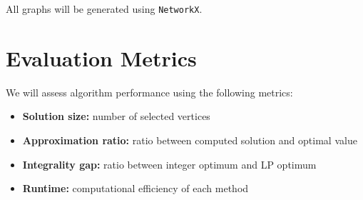 \documentclass[11pt,a4paper]{article}
\begin{document}
All graphs will be generated using \texttt{NetworkX}.

\section{Evaluation Metrics}

We will assess algorithm performance using the following metrics:

\begin{itemize}[leftmargin=*]
    \item \textbf{Solution size:} number of selected vertices
    \item \textbf{Approximation ratio:} ratio between computed solution and optimal value
    \item \textbf{Integrality gap:} ratio between integer optimum and LP optimum
    \item \textbf{Runtime:} computational efficiency of each method
\end{itemize}
\end{document}

